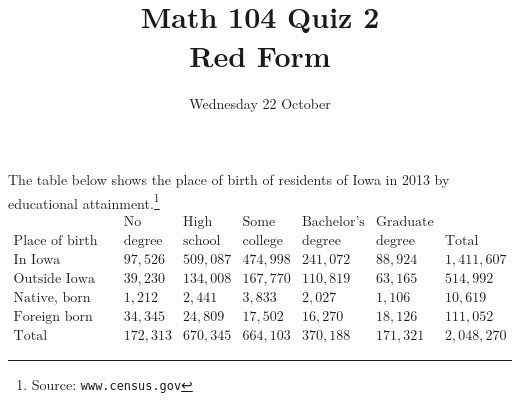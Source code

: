 \documentclass[answers,12pt]{exam}
\title{Math 104 Quiz 2\\Red Form}
\date{Wednesday 22 October}
\begin{document}
\maketitle
\begin{center}
\end{center}

The table below shows the place of birth of residents of Iowa
in 2013 by educational attainment.\footnote{Source: \tt www.census.gov}
\[\begin{array}{r|rrrrr|r}
&\text{No}&\text{High}&\text{Some}&\text{Bachelor's}&\text{Graduate}\\
\text{Place of birth}&\text{degree}
&\text{school}&\text{college}&\text{degree}&\text{degree}&\text{Total}
\\\hline
\text{In Iowa}
&97,526&509,087&474,998&241,072&88,924&1,411,607\\
\text{Outside Iowa}
&39,230&134,008&167,770&110,819&63,165&514,992\\
\text{Native, born outside US}
&1,212&2,441&3,833&2,027&1,106&10,619\\
\text{Foreign born}
&34,345&24,809&17,502&16,270&18,126&111,052\\\hline
\text{Total}
&172,313&670,345&664,103&370,188&171,321&2,048,270
\end{array}\]
\end{document}
